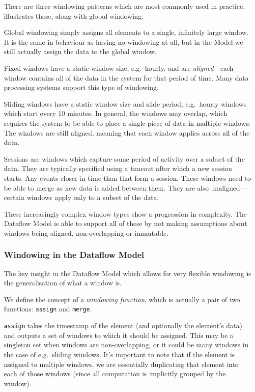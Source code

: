 There are three windowing patterns which are most commonly used in practice.
 illustrates these, along with global windowing.

Global windowing simply assigns all elements to a single, infinitely large window.
It is the same in behaviour as having no windowing at all, but in the Model we still actually assign the data to the global window.

Fixed windows have a static window size, e.g.\ hourly, and are \emph{aligned}---each window contains all of the data in the system for that period of time.
Many data processing systems support this type of windowing.

Sliding windows have a static window size and slide period, e.g.\ hourly windows which start every 10 minutes.
In general, the windows may overlap, which requires the system to be able to place a single piece of data in multiple windows.
The windows are still aligned, meaning that each window applies across all of the data.

Sessions are windows which capture some period of activity over a subset of the data.
They are typically specified using a timeout after which a new session starts.
Any events closer in time than that form a session.
These windows need to be able to merge as new data is added between them.
They are also unaligned---certain windows apply only to a subset of the data.

These increasingly complex window types show a progression in complexity.
The Dataflow Model is able to support all of these by not making assumptions about windows being aligned, non-overlapping or immutable.

\subsubsection{Windowing in the Dataflow Model}
The key insight in the Dataflow Model which allows for very flexible windowing is the generalisation of what a window is.

We define the concept of a \emph{windowing function}, which is actually a pair of two functions: \texttt{assign} and \texttt{merge}.

\texttt{assign} takes the timestamp of the element (and optionally the element's data) and outputs a set of windows to which it should be assigned.
This may be a singleton set when windows are non-overlapping, or it could be many windows in the case of e.g.\ sliding windows.
It's important to note that if the element is assigned to multiple windows, we are essentially duplicating that element into each of those windows (since all computation is implicitly grouped by the window).

